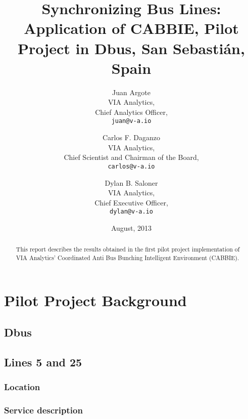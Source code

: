 \documentclass[11pt,letterpaper,]{report}
\begin{document}
\title{Synchronizing Bus Lines: Application of CABBIE, Pilot Project in Dbus, San Sebasti\'{a}n, Spain}
\author{Juan Argote\\
	VIA Analytics,\\
	Chief Analytics Officer,\\
	\texttt{juan@v-a.io} 
\and Carlos F. Daganzo\\
	VIA Analytics,\\
	Chief Scientist and Chairman of the Board, \\
	\texttt{carlos@v-a.io}
\and Dylan B. Saloner\\
	VIA Analytics,\\
	Chief Executive Officer,\\
	\texttt{dylan@v-a.io}}
\date{August, 2013}
\maketitle	

\renewcommand{\abstractname}{Executive Summary}
\begin{abstract}
This report describes the results obtained in the first pilot project implementation of VIA Analytics' Coordinated Anti Bus Bunching Intelligent Environment (CABBIE). 

\end{abstract}

\tableofcontents

\listoffigures
\listoftables

\chapter{Pilot Project Background}

\section{Dbus}

\section{Lines 5 and 25}

\subsection{Location}

\subsection{Service description}
\end{document}
